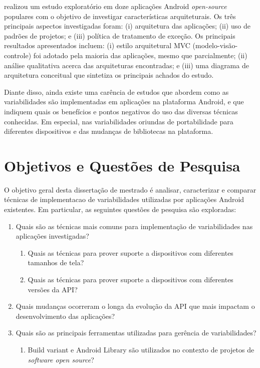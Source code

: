  realizou um estudo exploratório em doze aplicações Android
\textit{open-source}
populares com o objetivo de investigar características arquiteturais. Os três
principais aspectos investigadas foram: (i) arquitetura das aplicações;
(ii) uso de padrões de projetos; e (iii) política de tratamento de exceção.
Os principais resultados apresentados incluem: (i) estilo arquitetural MVC
(modelo-visão-controle) foi adotado pela maioria das aplicações,
mesmo que parcialmente; (ii) análise qualitativa acerca das arquiteturas encontradas;
e (iii) uma diagrama de arquitetura conceitual que sintetiza os principais achados do estudo.

Diante disso, ainda existe uma carência de estudos que abordem como as variabilidades
são implementadas em aplicações na plataforma Android, e que indiquem quais os
benefícios e pontos negativos do uso das diversas técnicas conhecidas. Em especial,
nas variabilidades oriundas de portabilidade para diferentes dispositivos e das
mudanças de bibliotecas na plataforma.

\section{Objetivos e Questões de Pesquisa}

O objetivo geral desta dissertação de mestrado é analisar, caracterizar e comparar
técnicas de implementacao de variabilidades utilizadas por aplicações Android
existentes. Em particular, as seguintes questões de pesquisa são exploradas:
\begin{enumerate}
    \item Quais são as técnicas mais comuns para implementação de variabilidades
          nas aplicações investigadas?
          \begin{enumerate}
            \item Quais as técnicas para prover suporte a dispositivos com diferentes tamanhos de tela? 
            \item Quais as técnicas para prover suporte a dispositivos com diferentes versões da API?
          \end{enumerate}
    \item Quais mudanças ocorreram o longa da evolução da API que mais impactam o desenvolvimento das aplicações?
    \item Quais são as principais ferramentas utilizadas para gerência de variabilidades?
         \begin{enumerate}
            \item Build variant e Android Library são utilizados no contexto de projetos de \textit{software open source}? 
         \end{enumerate}
\end{enumerate}

